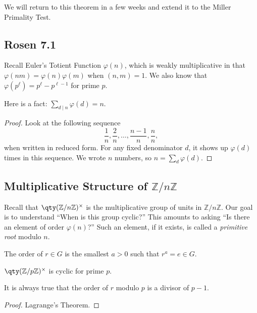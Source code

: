 We will return to this theorem in a few weeks and extend it to the Miller Primality Test.

\subsection{Rosen 7.1}

Recall Euler's Totient Function $\varphi(n)$, which is weakly multiplicative in that $\varphi(nm) =\varphi(n)\varphi(m)$ when $(n,m) = 1$. We also know that $\varphi(p^\ell) = p^\ell - p^{\ell - 1}$ for prime $p$.

Here is a fact: $\sum_{d \mid n} \varphi(d) = n$.

\begin{proof}
Look at the following sequence \[ \frac{1}{n}, \frac{2}{n}, \dotsc, \frac{n-1}{n}, \frac{n}{n}, \]
when written in reduced form. For any fixed denominator $d$, it shows up $\varphi(d)$ times in this sequence. We wrote $n$ numbers, so $n = \sum_d \varphi(d)$.
\end{proof}

\subsection{Multiplicative Structure of\/ \texorpdfstring{$\mathbb{Z}/n\mathbb{Z}$}{Z/nZ}}

Recall that $\qty(\mathbb{Z}/n\mathbb{Z})^\times$ is the multiplicative group of units in $\mathbb{Z}/n\mathbb{Z}$. Our goal is to understand ``When is this group cyclic?'' This amounts to asking ``Is there an element of order $\varphi(n)$?'' Such an element, if it exists, is called a \emph{primitive root} modulo $n$.

\begin{definition}[Order]
The order of $r \in G$ is the smallest $a>0$ such that $r^a = e \in G$.
\end{definition}

\begin{theorem}
$\qty(\mathbb{Z}/p\mathbb{Z})^\times$ is cyclic for prime $p$.
\end{theorem}

\begin{lemma}
It is always true that the order of $r$ modulo $p$ is a divisor of $p-1$.
\end{lemma}

\begin{proof}
Lagrange's Theorem.
\end{proof}